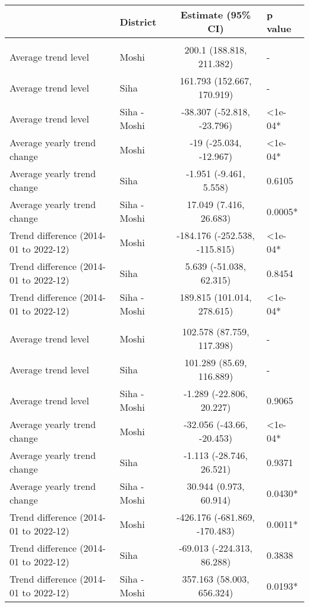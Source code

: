 \begingroup
\fontsize{12.0pt}{14.4pt}\selectfont
\begin{longtable}{l|lcl}
\toprule
 & District & Estimate (95\% CI) & p value \\ 
\midrule\addlinespace[2.5pt]
\multicolumn{4}{l}{Chronic Respiratory Disease} \\[2.5pt] 
\midrule\addlinespace[2.5pt]
Average trend level & Moshi & 200.1 (188.818, 211.382) & - \\ 
Average trend level & Siha & 161.793 (152.667, 170.919) & - \\ 
Average trend level & Siha - Moshi & -38.307 (-52.818, -23.796) & <1e-04* \\ 
Average yearly trend change & Moshi & -19 (-25.034, -12.967) & <1e-04* \\ 
Average yearly trend change & Siha & -1.951 (-9.461, 5.558) & 0.6105 \\ 
Average yearly trend change & Siha - Moshi & 17.049 (7.416, 26.683) & 0.0005* \\ 
Trend difference (2014-01 to 2022-12) & Moshi & -184.176 (-252.538, -115.815) & <1e-04* \\ 
Trend difference (2014-01 to 2022-12) & Siha & 5.639 (-51.038, 62.315) & 0.8454 \\ 
Trend difference (2014-01 to 2022-12) & Siha - Moshi & 189.815 (101.014, 278.615) & <1e-04* \\ 
\midrule\addlinespace[2.5pt]
\multicolumn{4}{l}{Caries} \\[2.5pt] 
\midrule\addlinespace[2.5pt]
Average trend level & Moshi & 102.578 (87.759, 117.398) & - \\ 
Average trend level & Siha & 101.289 (85.69, 116.889) & - \\ 
Average trend level & Siha - Moshi & -1.289 (-22.806, 20.227) & 0.9065 \\ 
Average yearly trend change & Moshi & -32.056 (-43.66, -20.453) & <1e-04* \\ 
Average yearly trend change & Siha & -1.113 (-28.746, 26.521) & 0.9371 \\ 
Average yearly trend change & Siha - Moshi & 30.944 (0.973, 60.914) & 0.0430* \\ 
Trend difference (2014-01 to 2022-12) & Moshi & -426.176 (-681.869, -170.483) & 0.0011* \\ 
Trend difference (2014-01 to 2022-12) & Siha & -69.013 (-224.313, 86.288) & 0.3838 \\ 
Trend difference (2014-01 to 2022-12) & Siha - Moshi & 357.163 (58.003, 656.324) & 0.0193* \\ 

\end{longtable}
